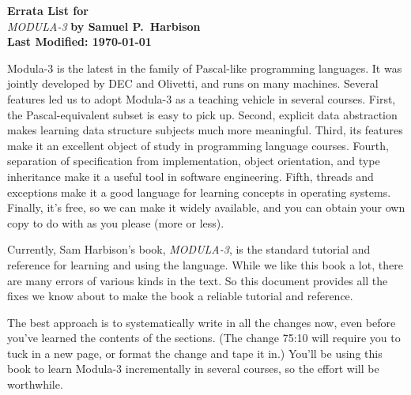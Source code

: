 \pagestyle{empty}
\setlength{\topmargin}{-0.5in}
\setlength{\leftmargin}{0.0in}
\setlength{\evensidemargin}{0.0in}
\setlength{\oddsidemargin}{0.0in}
\setlength{\textwidth}{6.375in}
\setlength{\textheight}{9.0in}
\setlength{\parskip}{7pt}



\begin{center}
{\large \bf Errata List for}\\
{\large {\em MODULA-3} \bf by Samuel P.\ Harbison}\\
{\bf Last Modified:  \today}
\end{center}

\noindent
Modula-3 is the latest in the family of Pascal-like programming
languages.  It was jointly developed by DEC and Olivetti, and
runs on many machines.
Several features led us to adopt Modula-3 as a teaching vehicle
in several courses.
First, the Pascal-equivalent subset is easy to pick up.
Second, explicit data abstraction makes learning data structure
subjects much more meaningful.
Third, its features make it an excellent object of study in
programming language courses.
Fourth, separation of specification from implementation, object
orientation, and type inheritance make it a useful tool in software
engineering.
Fifth, threads and exceptions make it a good language for learning
concepts in operating systems.
Finally, it's free, so we can make it widely available, and you can obtain your
own copy to do with as you please (more or less).

\noindent
Currently, Sam Harbison's book, {\em MODULA-3}, is the standard tutorial and
reference for learning and using the language.
While we like this book a lot, there are many errors of various kinds
in the text.  So this document provides all the fixes we know about to
make the book a reliable tutorial and reference.

\noindent
The best approach is to systematically write in all the changes now,
even before you've learned the contents of the sections.  (The change
75:10 will require you to tuck in a new page, or format the change and
tape it in.)  You'll be using this book to learn Modula-3
incrementally in several courses, so the effort will be worthwhile.

